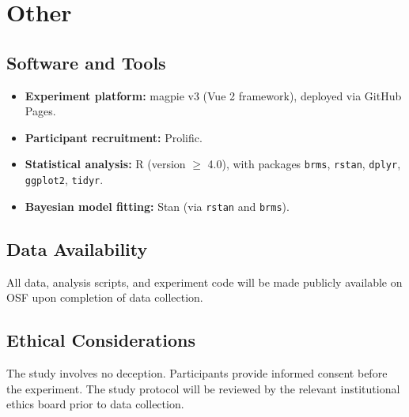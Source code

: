 \documentclass[12pt]{article}
\begin{document}
\section{Other}

\subsection{Software and Tools}
\begin{itemize}
    \item \textbf{Experiment platform:} magpie v3 (Vue 2 framework), deployed via GitHub Pages.
    \item \textbf{Participant recruitment:} Prolific.
    \item \textbf{Statistical analysis:} R (version $\geq$ 4.0), with packages \texttt{brms}, \texttt{rstan}, \texttt{dplyr}, \texttt{ggplot2}, \texttt{tidyr}.
    \item \textbf{Bayesian model fitting:} Stan (via \texttt{rstan} and \texttt{brms}).
\end{itemize}

\subsection{Data Availability}
All data, analysis scripts, and experiment code will be made publicly available on OSF upon completion of data collection.

\subsection{Ethical Considerations}
The study involves no deception. Participants provide informed consent before the experiment. The study protocol will be reviewed by the relevant institutional ethics board prior to data collection.
\end{document}
